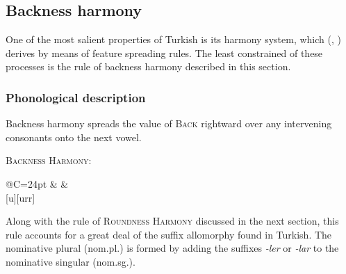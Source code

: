\subsection{Backness harmony}

One of the most salient properties of Turkish is its harmony system, which \citeauthor{Lees1966b} (\citeyear[][35]{Lees1966b}, \citeyear[][284]{Lees1966a}) derives by means of feature spreading rules. The least constrained of these processes is the rule of backness harmony described in this section. 

\subsubsection{Phonological description}

Backness harmony spreads the value of \textsc{Back} rightward over any intervening consonants onto the next vowel. 

\begin{example}
\textsc{Backness Harmony}: 

\xymatrix@R=24pt@C=24pt{
                                        &  &  \\
\ar@{-}[u][urr] \\
}
\end{example}

Along with the rule of \textsc{Roundness Harmony} discussed in the next section, this rule accounts for a great deal of the suffix allomorphy found in Turkish. The nominative plural (nom.pl.) is formed by adding the suffixes \emph{-ler} or \emph{-lar} to the nominative singular (nom.sg.). 

